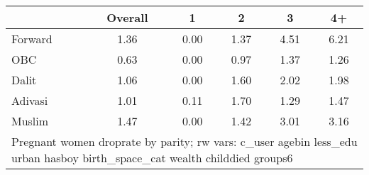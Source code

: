 \begin{tabular}{l*{5}{c}}
\toprule
            &\multicolumn{1}{c}{Overall}&\multicolumn{1}{c}{1}&\multicolumn{1}{c}{2}&\multicolumn{1}{c}{3}&\multicolumn{1}{c}{4+}\\
\midrule
\midrule
Forward     &        1.36&        0.00&        1.37&        4.51&        6.21\\
OBC         &        0.63&        0.00&        0.97&        1.37&        1.26\\
Dalit       &        1.06&        0.00&        1.60&        2.02&        1.98\\
Adivasi     &        1.01&        0.11&        1.70&        1.29&        1.47\\
Muslim      &        1.47&        0.00&        1.42&        3.01&        3.16\\
\bottomrule
\multicolumn{6}{l}{\footnotesize Pregnant women droprate by parity; rw vars: c\_user agebin less\_edu urban hasboy birth\_space\_cat wealth childdied groups6}\\
\end{tabular}
